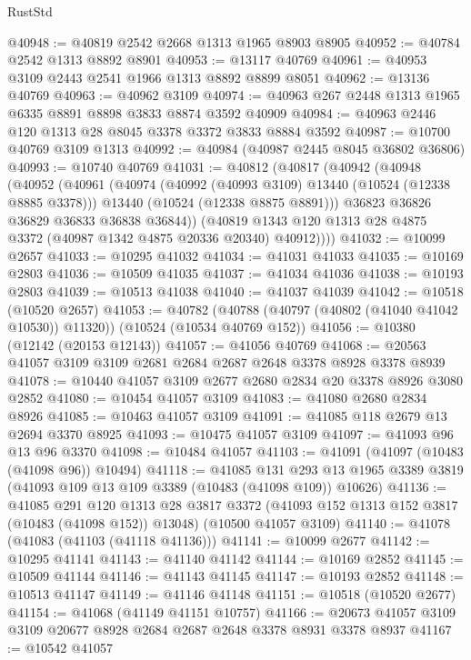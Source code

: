 \begin{lexlean}{RustStd}
\begin{coremodule}
@40948 := @40819 @2542 @2668 @1313 @1965 @8903 @8905
@40952 := @40784 @2542 @1313 @8892 @8901
@40953 := @13117 @40769
@40961 := @40953 @3109 @2443 @2541 @1966 @1313 @8892 @8899 @8051
@40962 := @13136 @40769
@40963 := @40962 @3109
@40974 := @40963 @267 @2448 @1313 @1965 @6335 @8891 @8898 @3833 @8874 @3592 @40909
@40984 := @40963 @2446 @120 @1313 @28 @8045 @3378 @3372 @3833 @8884 @3592
@40987 := @10700 @40769 @3109 @1313
@40992 := @40984 (@40987 @2445 @8045 @36802 @36806)
@40993 := @10740 @40769
@41031 := @40812
    (@40817
      (@40942
        (@40948
          (@40952
            (@40961
              (@40974
                (@40992 (@40993 @3109) @13440 (@10524 (@12338 @8885 @3378)))
                @13440
                (@10524 (@12338 @8875 @8891)))
              @36823
              @36826
              @36829
              @36833
              @36838
              @36844))
          (@40819 @1343 @120 @1313 @28 @4875 @3372 (@40987 @1342 @4875 @20336 @20340) @40912))))
@41032 := @10099 @2657
@41033 := @10295 @41032
@41034 := @41031 @41033
@41035 := @10169 @2803
@41036 := @10509 @41035
@41037 := @41034 @41036
@41038 := @10193 @2803
@41039 := @10513 @41038
@41040 := @41037 @41039
@41042 := @10518 (@10520 @2657)
@41053 := @40782
    (@40788 (@40797 (@40802 (@41040 @41042 @10530)) @11320))
    (@10524 (@10534 @40769 @152))
@41056 := @10380 (@12142 (@20153 @12143))
@41057 := @41056 @40769
@41068 := @20563 @41057 @3109 @3109 @2681 @2684 @2687 @2648 @3378 @8928 @3378 @8939
@41078 := @10440 @41057 @3109 @2677 @2680 @2834 @20 @3378 @8926 @3080 @2852
@41080 := @10454 @41057 @3109
@41083 := @41080 @2680 @2834 @8926
@41085 := @10463 @41057 @3109
@41091 := @41085 @118 @2679 @13 @2694 @3370 @8925
@41093 := @10475 @41057 @3109
@41097 := @41093 @96 @13 @96 @3370
@41098 := @10484 @41057
@41103 := @41091 (@41097 (@10483 (@41098 @96)) @10494)
@41118 := @41085
    @131
    @293
    @13
    @1965
    @3389
    @3819
    (@41093 @109 @13 @109 @3389 (@10483 (@41098 @109)) @10626)
@41136 := @41085
    @291
    @120
    @1313
    @28
    @3817
    @3372
    (@41093 @152 @1313 @152 @3817 (@10483 (@41098 @152)) @13048)
    (@10500 @41057 @3109)
@41140 := @41078 (@41083 (@41103 (@41118 @41136)))
@41141 := @10099 @2677
@41142 := @10295 @41141
@41143 := @41140 @41142
@41144 := @10169 @2852
@41145 := @10509 @41144
@41146 := @41143 @41145
@41147 := @10193 @2852
@41148 := @10513 @41147
@41149 := @41146 @41148
@41151 := @10518 (@10520 @2677)
@41154 := @41068 (@41149 @41151 @10757)
@41166 := @20673 @41057 @3109 @3109 @20677 @8928 @2684 @2687 @2648 @3378 @8931 @3378 @8937
@41167 := @10542 @41057

\end{coremodule}
\end{lexlean}
